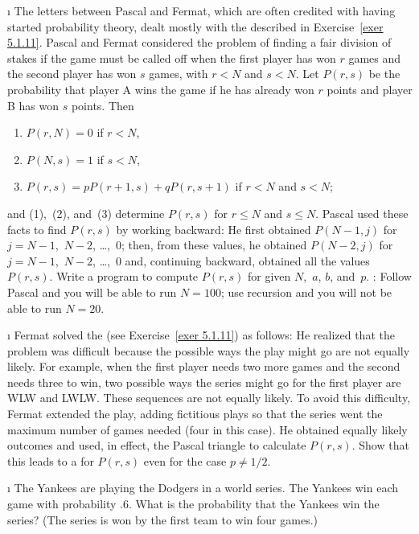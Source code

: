 \begin{LJSItem}
\i\label{exer 5.1.12} The letters between Pascal and Fermat, which
are often credited with having started probability theory, dealt mostly with the  described in Exercise~\ref{exer 5.1.11}.  Pascal and Fermat considered the problem of
finding a fair division of stakes if the game must be called off when the first player has won
$r$ games and the second player has won $s$ games, with $r < N$ and $s < N$.  Let $P(r,s)$ be the
probability that player A wins the game if he has already won $r$ points and player B has won
$s$ points.  Then
\begin{enumerate}
\item $P(r,N) = 0$ if $r < N$,
\item $P(N,s) = 1$ if $s < N$,
\item $P(r,s) = pP(r + 1,s) + qP(r,s + 1)$ if $r < N$ and $s < N$;
\end{enumerate} and (1),~(2), and~(3) determine $P(r,s)$ for $r \leq N$ and $s \leq N$.  Pascal
used these facts to find $P(r,s)$ by working backward: He first obtained $P(N - 1,j)$ for $j =
N - 1$,~$N - 2$, \dots,~0; then, from these values, he obtained
$P(N - 2,j)$ for $j = N - 1$,~$N - 2$, \dots,~0 and, continuing backward, obtained all the
values $P(r,s)$.  Write a program to compute $P(r,s)$ for given $N$,~$a$, $b$, and~$p$.  : Follow Pascal and you will be able to run $N = 100$; use recursion and you will
not be able to run $N = 20$.

\i\label{exer 5.1.13} Fermat solved the  (see Exercise~\ref{exer
5.1.11}) as follows: He realized that the problem was difficult because the possible ways the
play might go are not equally likely.  For example, when the first player needs two more games
and the second needs three to win, two possible ways the series might go for the first player
are WLW and LWLW.  These sequences are not equally likely.  To avoid this difficulty, Fermat
extended the play, adding fictitious plays so that the series went the maximum number of games
needed (four in this case).  He obtained equally likely outcomes and used, in effect, the
Pascal triangle to calculate $P(r,s)$.  Show that this leads to a  for $P(r,s)$
even for the case $p \ne 1/2$.

\i\label{exer 5.1.14} The Yankees are playing the Dodgers in a world series.  The Yankees win
each game with probability .6.  What is the probability that the Yankees win the series?  (The
series is won by the first team to win four games.)


\end{LJSItem}
